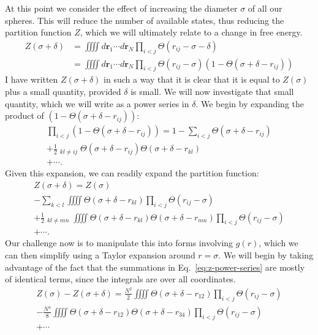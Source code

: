 \documentclass[letterpaper,twocolumn,amsmath,amssymb,pre,aps,10pt]{revtex4-1}
\newcommand{\rr}{\textbf{r}}
\begin{document}
At this point we consider the effect of increasing the diameter
$\sigma$ of all our spheres.  This will reduce the number of available
states, thus reducing the partition function $Z$, which we will
ultimately relate to a change in free energy.
\begin{align}
  Z(\sigma+\delta) &= \iiiint d\rr_1\cdots d\rr_N \prod_{i<j} \Theta(r_{ij}-\sigma-\delta)
  \\
  &= \iiiint d\rr_1\cdots d\rr_N \prod_{i<j} \Theta(r_{ij}-\sigma)(1-\Theta(\sigma+\delta-r_{ij}))
\end{align}
I have written $Z(\sigma+\delta)$ in such a way that it is clear that
it is equal to $Z(\sigma)$ plus a small quantity, provided $\delta$ is
small.  We will now investigate that small quantity, which we will
write as a power series in $\delta$.  We begin by expanding the
product of $(1-\Theta(\sigma+\delta-r_{ij}))$:
\begin{multline}
    \prod_{i<j}(1-\Theta(\sigma+\delta-r_{ij})) =
    1 - \sum_{i<j} \Theta(\sigma+\delta-r_{ij}) \\
    + \frac{1}{2}\mathop{\mathop{\sum_{i<j}}_{k<l}}_{kl \ne ij}
    \Theta(\sigma+\delta-r_{ij}) \Theta(\sigma+\delta-r_{kl})
    \\ + \cdots.
\end{multline}
Given this expansion, we can readily expand the partition function:
\begin{multline}
  Z(\sigma+\delta) = Z(\sigma) \\ -
  \sum_{k<l} \iiiint \Theta(\sigma+\delta-r_{kl}) \prod_{i<j}
  \Theta(r_{ij}-\sigma) \\
  + \frac{1}{2}\mathop{\mathop{\sum_{k<l}}_{m<n}}_{kl\ne mn}
  \iiiint \Theta(\sigma+\delta-r_{kl}) \Theta(\sigma+\delta-r_{mn}) \prod_{i<j}
  \Theta(r_{ij}-\sigma) \\
  + \cdots.\label{eq:z-power-series}
\end{multline}
Our challenge now is to manipulate this into forms involving $g(r)$,
which we can then simplify using a Taylor expansion around
$r=\sigma$.  We will begin by taking advantage of the fact that the
summations in Eq.~\ref{eq:z-power-series} are mostly of identical
terms, since the integrals are over all coordinates.
\begin{multline}
  Z(\sigma)-Z(\sigma+\delta) =
  \frac{N^2}{2}\iiiint \Theta(\sigma+\delta-r_{12})
  \prod_{i<j} \Theta(r_{ij}-\sigma) \\
  - \frac{N^4}{8}\iiiint
  \Theta(\sigma+\delta-r_{12})
  \Theta(\sigma+\delta-r_{34})
  \prod_{i<j} \Theta(r_{ij}-\sigma) \\
  + \cdots \label{eq:z-expansion}
\end{multline}
\end{document}

